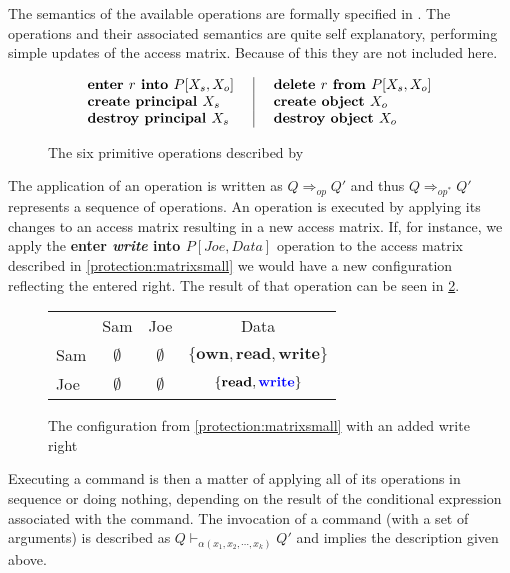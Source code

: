 The semantics of the available operations are formally specified in \citet[p. 463]{HRU}.
The operations and their associated semantics are quite self explanatory, performing simple updates of the access matrix.
Because of this they are not included here.

\begin{figure}[H]
 \centering
 \[\arraycolsep=14pt%
 \begin{array}{l|l}
  \textbf{enter } r \textbf{ into } P[X_s, X_o] & \textbf{delete } r \textbf{ from } P[X_s, X_o]\\
  \textbf{create \ssubject{} } X_s & \textbf{create object } X_o\\
  \textbf{destroy \ssubject{} } X_s & \textbf{destroy object } X_o
 \end{array}
 \]
 \caption{The six primitive operations described by \cite{HRU}}
 \label{protection:operations}
\end{figure}

The application of an operation is written as $Q \Rightarrow_{op} Q'$ and thus $Q \Rightarrow_{op^*} Q'$ represents a sequence of operations.
An operation is executed by applying its changes to an access matrix resulting in a new access matrix.
If, for instance, we apply the \textbf{enter \textit{write} into $P[Joe, Data]$} operation to the access matrix described in \cref{protection:matrixsmall} we would have a new configuration reflecting the entered right.
The result of that operation can be seen in \cref{protection:matrixwithwrite}.

\begin{figure}[H]
\centering
\begin{tabular}{l|c|c|c|}
\multicolumn{1}{c}{} & \multicolumn{1}{c}{Sam} & \multicolumn{1}{c}{Joe} & \multicolumn{1}{c}{Data} \\\cline{2-4}
Sam & $\emptyset$ & $\emptyset$ & $\{\textbf{own}, \textbf{read}, \textbf{write}\}$ \\\cline{2-4}
Joe & $\emptyset$ & $\emptyset$ & $\{\textbf{read}, {\color{blue}\textbf{write}}\}$ \\\cline{2-4}
\end{tabular}
\caption{The configuration from \cref{protection:matrixsmall} with an added write right}
\label{protection:matrixwithwrite}
\end{figure}

Executing a command is then a matter of applying all of its operations in sequence or doing nothing, depending on the result of the conditional expression associated with the command.
The invocation of a command (with a set of arguments) is described as $Q \vdash_{\alpha(x_1, x_2, \cdots, x_k)} Q'$ and implies the description given above.

